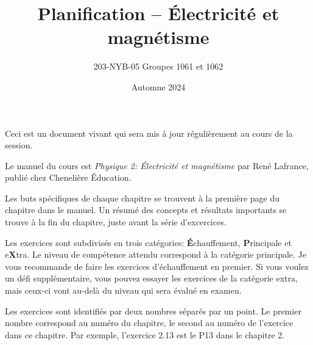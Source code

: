 \documentclass[10pt]{article}
\title{Planification -- Électricité et magnétisme}
\author{203-NYB-05  Groupes 1061 et 1062}
\date{Automne 2024}
\begin{document}
\makeatletter
\begin{center}
  {\LARGE \noindent\@title}
  \vspace{0.6em}

  {\large \noindent\@author}
  \vspace{0.2em}

  {\large \noindent\@date}
\end{center}
\vspace{2em}
\makeatother

\noindent Ceci est un document vivant qui sera mis à jour régulièrement au cours de la
session.

\vspace{1em}

\noindent Le manuel du cours est \emph{Physique 2: Électricité et magnétisme} par René
Lafrance, publié chez Chenelière Éducation.

\vspace{1em}

\noindent Les buts spécifiques de chaque chapitre se trouvent à la première
page du chapitre dans le manuel. Un résumé des concepts et résultats importants
se trouve à la fin du chapitre, juste avant la série d'excercices.

\vspace{1em}

\noindent Les exercices sont subdivisés en trois catégories:
\textbf{É}chauffement, \textbf{P}rincipale et e\textbf{X}tra. Le niveau de
compétence attendu correspond à la catégorie principale. Je vous recommande de
faire les exercices d'échauffement en premier. Si vous voulez un défi
supplémentaire, vous pouvez essayer les exercices de la catégorie extra, mais
ceux-ci vont au-delà du niveau qui sera évalué en examen.

\vspace{1em}

\noindent Les exercices sont identifiés par deux nombres séparés par un point.
Le premier nombre correspond au numéro du chapitre, le second au numéro de
l'exercice dans ce chapitre. Par exemple, l'exercice 2.13 est le P13 dans le
chapitre 2.
\end{document}
